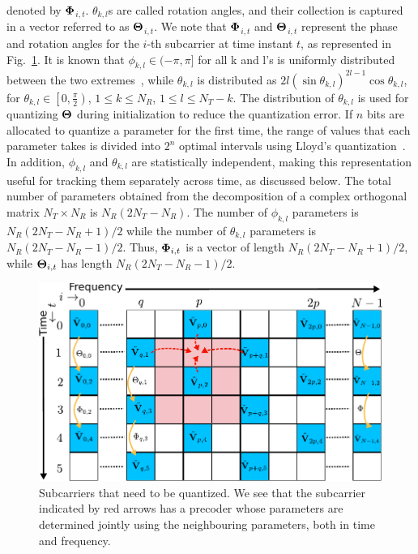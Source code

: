\documentclass[journal,10pt,twocolumn]{IEEEtran}
\begin{document}
denoted by $\bf{\Phi}$$_{i,t}$.
$\theta_{k,l}$s are called rotation angles, and their collection is
captured in a vector referred to as
$\bf{\Theta}$$_{i,t}$. We note that
$\bf{\Phi}$$_{i,t}$ and $\bf{\Theta}$$_{i,t}$ represent the phase and
rotation angles for the $i$-th subcarrier at time instant $t$, as
represented in Fig.~\ref{fig:adpm-fig}. It is known 
that $\phi_{k,l} \in (-\pi, \pi]$ for all k and l's is uniformly
distributed between the two extremes~\cite{4114278}, while
$\theta_{k,l}$ is distributed as
$2l(\sin\theta_{k,l})^{2l-1}\cos\theta_{k,l}$, for
$\theta_{k,l} \in \left[0, \frac{\pi}{2}\right)$, $1\leq k \leq N_R$,
$1\leq l \leq N_T -k$.  The distribution of $\theta_{k,l}$ is used for
quantizing $\bf{\Theta}$ during initialization to reduce the
quantization error.  If $n$ bits are allocated to quantize a parameter
for the first time, the range of values that each parameter takes is
divided into $2^n$ optimal intervals using Lloyd's
quantization~\cite{lloyd1982least}. In addition, $\phi_{k,l}$ and
$\theta_{k,l}$ are statistically independent, making this
representation useful for tracking them separately across time, as
discussed below. The total number of parameters obtained from the
decomposition of a complex orthogonal matrix $N_{T} \times N_{R} $ is
$N_{R}(2N_{T} - N_{R})$. The number of $\phi_{k,l}$ parameters is
$N_{R}(2N_{T} - N_{R}+1)/2$ while the number of $\theta_{k,l}$
parameters is $N_{R}(2N_{T} - N_{R}-1)/2$. Thus, ${\bf{\Phi}}_{i,t}$
is a vector of length $N_{R}(2N_{T} - N_{R}+1)/2$, while
${\bf{\Theta}}_{i,t}$ has length
$N_{R}(2N_{T} - N_{R}-1)/2$.~\cite{4114278}
\begin{figure}
\begin{center}
\includegraphics[width=0.7\columnwidth]{images/new-adpm.pdf}
\caption{\label{fig:adpm-fig}Subcarriers that need to be
  quantized. We see that the subcarrier indicated by
  red arrows has a precoder whose parameters are determined jointly
  using the neighbouring parameters, both in time and frequency.}
\end{center}
\end{figure}
\end{document}
